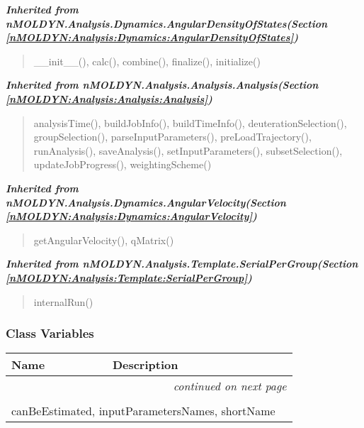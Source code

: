 \large{\textbf{\textit{Inherited from nMOLDYN.Analysis.Dynamics.AngularDensityOfStates\textit{(Section \ref{nMOLDYN:Analysis:Dynamics:AngularDensityOfStates})}}}}

\begin{quote}
\_\_init\_\_(), calc(), combine(), finalize(), initialize()
\end{quote}

\large{\textbf{\textit{Inherited from nMOLDYN.Analysis.Analysis.Analysis\textit{(Section \ref{nMOLDYN:Analysis:Analysis:Analysis})}}}}

\begin{quote}
analysisTime(), buildJobInfo(), buildTimeInfo(), deuterationSelection(), groupSelection(), parseInputParameters(), preLoadTrajectory(), runAnalysis(), saveAnalysis(), setInputParameters(), subsetSelection(), updateJobProgress(), weightingScheme()
\end{quote}

\large{\textbf{\textit{Inherited from nMOLDYN.Analysis.Dynamics.AngularVelocity\textit{(Section \ref{nMOLDYN:Analysis:Dynamics:AngularVelocity})}}}}

\begin{quote}
getAngularVelocity(), qMatrix()
\end{quote}

\large{\textbf{\textit{Inherited from nMOLDYN.Analysis.Template.SerialPerGroup\textit{(Section \ref{nMOLDYN:Analysis:Template:SerialPerGroup})}}}}

\begin{quote}
internalRun()
\end{quote}


  \subsubsection{Class Variables}

    \vspace{-1cm}
\hspace{\varindent}\begin{longtable}{|p{\varnamewidth}|p{\vardescrwidth}|l}
\cline{1-2}
\cline{1-2} \centering \textbf{Name} & \centering \textbf{Description}& \\
\cline{1-2}
\endhead\cline{1-2}\multicolumn{3}{r}{\small\textit{continued on next page}}\\\endfoot\cline{1-2}
\endlastfoot\multicolumn{2}{|l|}{\textit{Inherited from nMOLDYN.Analysis.Dynamics.AngularDensityOfStates \textit{(Section \ref{nMOLDYN:Analysis:Dynamics:AngularDensityOfStates})}}}\\
\multicolumn{2}{|p{\varwidth}|}{\raggedright canBeEstimated, inputParametersNames, shortName}\\
\cline{1-2}
\end{longtable}

